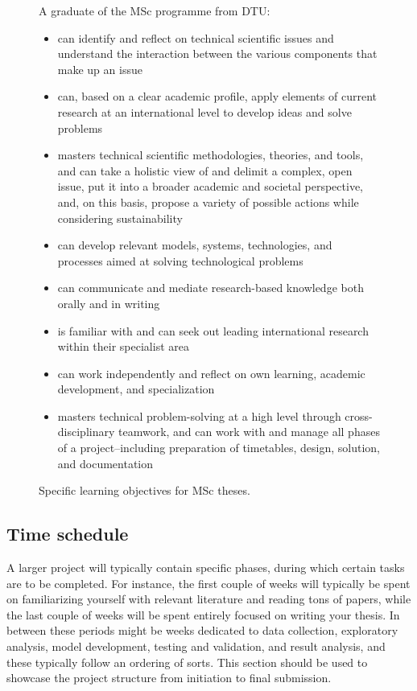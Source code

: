 \documentclass{article}
\begin{document}
\begin{figure}
    \begin{tcolorbox}[colframe=white]
    A graduate of the MSc programme from DTU:
    \begin{itemize}
        \item can identify and reflect on technical scientific issues and understand the interaction between the various components that make up an issue
        \item can, based on a clear academic profile, apply elements of current research at an international level to develop ideas and solve problems 
        \item masters technical scientific methodologies, theories, and tools, and can take a holistic view of and delimit a complex, open issue, put it into a broader academic and societal perspective, and, on this basis, propose a variety of possible actions while considering sustainability
        \item can develop relevant models, systems, technologies, and processes aimed at solving technological problems
        \item can communicate and mediate research-based knowledge both orally and in writing
        \item is familiar with and can seek out leading international research within their specialist area
        \item can work independently and reflect on own learning, academic development, and specialization
        \item masters technical problem-solving at a high level through cross-disciplinary teamwork, and can work with and manage all phases of a project--including preparation of timetables, design, solution, and documentation
    \end{itemize}
    \end{tcolorbox}
    \caption{Specific learning objectives for MSc theses.}
\end{figure}


\subsection{Time schedule}
A larger project will typically contain specific phases, during which certain tasks are to be completed.
For instance, the first couple of weeks will typically be spent on familiarizing yourself with relevant literature and reading tons of papers, while the last couple of weeks will be spent entirely focused on writing your thesis.
In between these periods might be weeks dedicated to data collection, exploratory analysis, model development, testing and validation, and result analysis, and these typically follow an ordering of sorts.
This section should be used to showcase the project structure from initiation to final submission.
\end{document}
